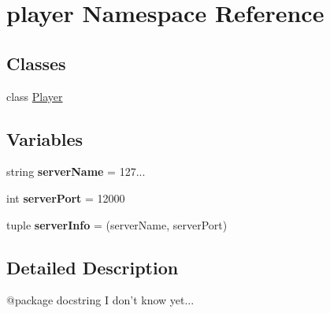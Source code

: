 \hypertarget{namespaceplayer}{}\section{player Namespace Reference}
\label{namespaceplayer}
\subsection*{Classes}
\begin{DoxyCompactItemize}
\item 
class \hyperlink{classplayer_1_1_player}{Player}
\end{DoxyCompactItemize}
\subsection*{Variables}
\begin{DoxyCompactItemize}
\item 
\mbox{\label{namespaceplayer_a4dd0f7ee2823f41a868527b5a2afe0c2}} 
string {\bfseries server\+Name} = \textquotesingle{}127...\textquotesingle{}
\item 
\mbox{\label{namespaceplayer_afe8c9b699c2174ac4db880e0c6313af1}} 
int {\bfseries server\+Port} = 12000
\item 
\mbox{\label{namespaceplayer_a989aa2cf7d00411646811152149404c2}} 
tuple {\bfseries server\+Info} = (server\+Name, server\+Port)
\end{DoxyCompactItemize}


\subsection{Detailed Description}
\begin{DoxyVerb}@package docstring
I don't know yet...
\end{DoxyVerb}
 